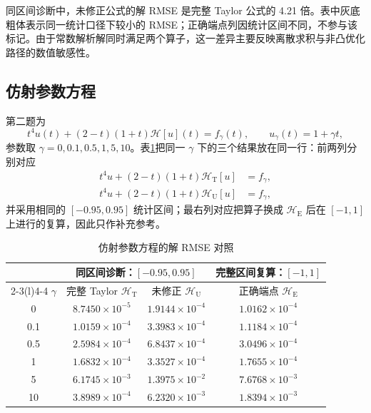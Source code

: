 \documentclass[UTF8,fontset=none,11pt,a4paper]{ctexart}
\newcommand{\best}[1]{\cellcolor{gray!15}\textbf{#1}}
\begin{document}
同区间诊断中，未修正公式的解 RMSE 是完整 Taylor 公式的 4.21 倍。表中灰底粗体表示同一统计口径下较小的 RMSE；正确端点列因统计区间不同，不参与该标记。由于常数解析解同时满足两个算子，这一差异主要反映离散求积与非凸优化路径的数值敏感性。

\subsection{仿射参数方程}

第二题为
\begin{equation}
t^4u(t)+(2-t)(1+t)\mathcal H[u](t)=f_{\gamma}(t),
\qquad u_{\gamma}(t)=1+\gamma t,
\end{equation}
参数取 $\gamma=0,0.1,0.5,1,5,10$。表\ref{tab:affine_diag}把同一 $\gamma$ 下的三个结果放在同一行：前两列分别对应
\begin{equation*}
\begin{aligned}
t^4u+(2-t)(1+t)\mathcal H_{\mathrm T}[u]&=f_\gamma,\\
t^4u+(2-t)(1+t)\mathcal H_{\mathrm U}[u]&=f_\gamma,
\end{aligned}
\end{equation*}
并采用相同的 $[-0.95,0.95]$ 统计区间；最右列对应把算子换成 $\mathcal H_{\mathrm E}$ 后在 $[-1,1]$ 上进行的复算，因此只作补充参考。

\begin{table}[H]
\centering
\caption{仿射参数方程的解 RMSE 对照}
\label{tab:affine_diag}
\begin{tabular}{cccc}
\toprule
& \multicolumn{2}{c}{同区间诊断：$[-0.95,0.95]$} & 完整区间复算：$[-1,1]$\\
\cmidrule(lr){2-3}\cmidrule(l){4-4}
$\gamma$ & 完整 Taylor $\mathcal H_{\mathrm T}$ & 未修正 $\mathcal H_{\mathrm U}$ & 正确端点 $\mathcal H_{\mathrm E}$\\
\midrule
0 & \best{$8.7450\times10^{-5}$} & $1.9144\times10^{-4}$ & $1.0162\times10^{-4}$\\
0.1 & \best{$1.0159\times10^{-4}$} & $3.3983\times10^{-4}$ & $1.1184\times10^{-4}$\\
0.5 & \best{$2.5984\times10^{-4}$} & $6.8437\times10^{-4}$ & $3.0496\times10^{-4}$\\
1 & \best{$1.6832\times10^{-4}$} & $3.3527\times10^{-4}$ & $1.7655\times10^{-4}$\\
5 & \best{$6.1745\times10^{-3}$} & $1.3975\times10^{-2}$ & $7.6768\times10^{-3}$\\
10 & \best{$3.8989\times10^{-4}$} & $6.2320\times10^{-3}$ & $1.8394\times10^{-3}$\\
\bottomrule
\end{tabular}
\end{table}
\end{document}
